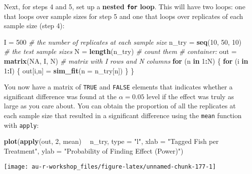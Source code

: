 \documentclass[]{book}
\newenvironment{Shaded}{\begin{snugshade}}{\end{snugshade}}
\newcommand{\KeywordTok}[1]{\textcolor[rgb]{0.13,0.29,0.53}{\textbf{#1}}}
\newcommand{\DataTypeTok}[1]{\textcolor[rgb]{0.13,0.29,0.53}{#1}}
\newcommand{\DecValTok}[1]{\textcolor[rgb]{0.00,0.00,0.81}{#1}}
\newcommand{\StringTok}[1]{\textcolor[rgb]{0.31,0.60,0.02}{#1}}
\newcommand{\CommentTok}[1]{\textcolor[rgb]{0.56,0.35,0.01}{\textit{#1}}}
\newcommand{\OtherTok}[1]{\textcolor[rgb]{0.56,0.35,0.01}{#1}}
\newcommand{\ControlFlowTok}[1]{\textcolor[rgb]{0.13,0.29,0.53}{\textbf{#1}}}
\newcommand{\OperatorTok}[1]{\textcolor[rgb]{0.81,0.36,0.00}{\textbf{#1}}}
\newcommand{\NormalTok}[1]{#1}
\theoremstyle{definition}
\theoremstyle{definition}
\theoremstyle{definition}
\theoremstyle{remark}
\begin{document}
Next, for steps 4 and 5, set up a \textbf{nested \texttt{for} loop}.
This will have two loops: one that loops over sample sizes for step 5
and one that loops over replicates of each sample size (step 4):

\begin{Shaded}
\begin{Highlighting}[]
\NormalTok{I =}\StringTok{ }\DecValTok{500}  \CommentTok{# the number of replicates at each sample size}
\NormalTok{n_try =}\StringTok{ }\KeywordTok{seq}\NormalTok{(}\DecValTok{10}\NormalTok{, }\DecValTok{50}\NormalTok{, }\DecValTok{10}\NormalTok{)  }\CommentTok{# the test sample sizes}
\NormalTok{N =}\StringTok{ }\KeywordTok{length}\NormalTok{(n_try)        }\CommentTok{# count them}
\CommentTok{# container: }
\NormalTok{out =}\StringTok{ }\KeywordTok{matrix}\NormalTok{(}\OtherTok{NA}\NormalTok{, I, N) }\CommentTok{# matrix with I rows and N columns}
\ControlFlowTok{for}\NormalTok{ (n }\ControlFlowTok{in} \DecValTok{1}\OperatorTok{:}\NormalTok{N) \{}
  \ControlFlowTok{for}\NormalTok{ (i }\ControlFlowTok{in} \DecValTok{1}\OperatorTok{:}\NormalTok{I) \{}
\NormalTok{    out[i,n] =}\StringTok{ }\KeywordTok{sim_fit}\NormalTok{(}\DataTypeTok{n =}\NormalTok{ n_try[n])}
\NormalTok{  \}}
\NormalTok{\}}
\end{Highlighting}
\end{Shaded}

You now have a matrix of \texttt{TRUE} and \texttt{FALSE} elements that
indicates whether a significant difference was found at the
\(\alpha = 0.05\) level if the effect was truly as large as you care
about. You can obtain the proportion of all the replicates at each
sample size that resulted in a significant difference using the
\texttt{mean} function with \texttt{apply}:

\begin{Shaded}
\begin{Highlighting}[]
\KeywordTok{plot}\NormalTok{(}\KeywordTok{apply}\NormalTok{(out, }\DecValTok{2}\NormalTok{, mean) }\OperatorTok{~}\StringTok{ }\NormalTok{n_try, }\DataTypeTok{type =} \StringTok{"l"}\NormalTok{,}
     \DataTypeTok{xlab =} \StringTok{"Tagged Fish per Treatment"}\NormalTok{,}
     \DataTypeTok{ylab =} \StringTok{"Probability of Finding Effect (Power)"}\NormalTok{)}
\end{Highlighting}
\end{Shaded}

\begin{center}\texttt{[image: au-r-workshop\_files/figure-latex/unnamed-chunk-177-1]} \end{center}
\end{document}
